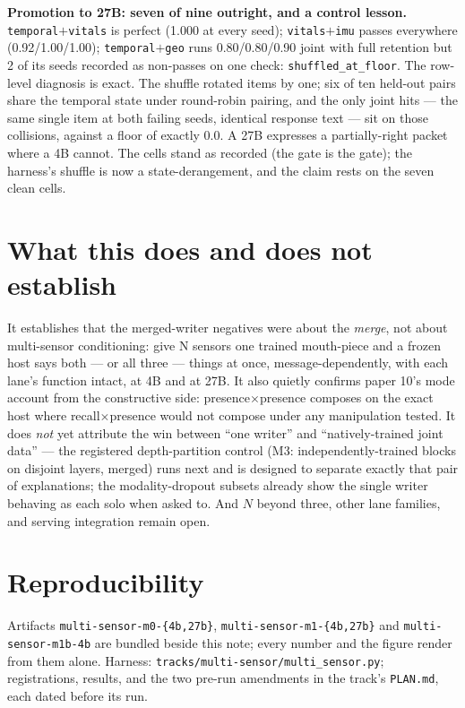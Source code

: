 \documentclass[11pt]{article}
\begin{document}
\textbf{Promotion to 27B: seven of nine outright, and a control lesson.}
\texttt{temporal$+$vitals} is perfect (1.000 at every seed);
\texttt{vitals$+$imu} passes everywhere
(0.92/1.00/1.00);
\texttt{temporal$+$geo} runs
0.80/0.80/0.90 joint with full retention but
2 of its seeds recorded as non-passes on one check:
\texttt{shuffled\_at\_floor}. The row-level diagnosis is exact. The
shuffle rotated items by one; six of ten held-out pairs share the
temporal state under round-robin pairing, and the only joint hits --- the
same single item at both failing seeds, identical response text --- sit
on those collisions, against a floor of exactly 0.0. A 27B expresses a
partially-right packet where a 4B cannot. The cells stand as recorded
(the gate is the gate); the harness's shuffle is now a state-derangement,
and the claim rests on the seven clean cells.

\section{What this does and does not establish}

It establishes that the merged-writer negatives were about the
\emph{merge}, not about multi-sensor conditioning: give N sensors one
trained mouth-piece and a frozen host says both --- or all three ---
things at once, message-dependently, with each lane's function intact,
at 4B and at 27B. It also quietly confirms paper 10's mode account from
the constructive side: presence$\times$presence composes on the exact
host where recall$\times$presence would not compose under any
manipulation tested. It does \emph{not} yet attribute the win between
``one writer'' and ``natively-trained joint data'' --- the registered
depth-partition control (M3: independently-trained blocks on disjoint
layers, merged) runs next and is designed to separate exactly that pair
of explanations; the modality-dropout subsets already show the single
writer behaving as each solo when asked to. And $N$ beyond three, other
lane families, and serving integration remain open.

\section{Reproducibility}

Artifacts \texttt{multi-sensor-m0-\{4b,27b\}},
\texttt{multi-sensor-m1-\{4b,27b\}} and \texttt{multi-sensor-m1b-4b}
are bundled beside this note; every number and the figure render from
them alone. Harness: \texttt{tracks/multi-sensor/multi\_sensor.py};
registrations, results, and the two pre-run amendments in the track's
\texttt{PLAN.md}, each dated before its run.
\end{document}
